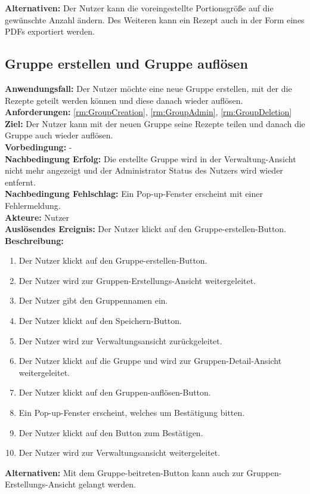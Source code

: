 \documentclass[parskip=full]{scrartcl}
\begin{document}
\textbf{Alternativen:} Der Nutzer kann die voreingestellte Portionsgröße auf die gewünschte Anzahl ändern. Des Weiteren kann ein Rezept auch in der Form eines PDFs exportiert werden.
\newpage

\subsection{Gruppe erstellen und Gruppe auflösen}
\textbf{Anwendungsfall:} Der Nutzer möchte eine neue Gruppe erstellen, mit der die Rezepte geteilt werden können und diese danach wieder auflösen.\\
\textbf{Anforderungen:} \ref{rm:GroupCreation}, \ref{rm:GroupAdmin}, \ref{rm:GroupDeletion} \\
\textbf{Ziel:} Der Nutzer kann mit der neuen Gruppe seine Rezepte teilen und danach die Gruppe auch wieder auflösen.\\
\textbf{Vorbedingung:} -\\
\textbf{Nachbedingung Erfolg:} Die erstellte Gruppe wird in der Verwaltung-Ansicht nicht mehr angezeigt und der Administrator Status des Nutzers wird wieder entfernt.\\
\textbf{Nachbedingung Fehlschlag:} Ein Pop-up-Fenster erscheint mit einer Fehlermeldung.\\
\textbf{Akteure:} Nutzer\\
\textbf{Auslösendes Ereignis:} Der Nutzer klickt auf den Gruppe-erstellen-Button.\\
\textbf{Beschreibung:}
\begin{enumerate}
    \item Der Nutzer klickt auf den Gruppe-erstellen-Button.
    \item Der Nutzer wird zur Gruppen-Erstellungs-Ansicht weitergeleitet.
    \item Der Nutzer gibt den Gruppennamen ein.
    \item Der Nutzer klickt auf den Speichern-Button.
    \item Der Nutzer wird zur Verwaltungsansicht zurückgeleitet.
    \item Der Nutzer klickt auf die Gruppe und wird zur Gruppen-Detail-Ansicht weitergeleitet.
    \item Der Nutzer klickt auf den Gruppen-auflösen-Button.
    \item Ein Pop-up-Fenster erscheint, welches um Bestätigung bitten.
    \item Der Nutzer klickt auf den Button zum Bestätigen.
    \item Der Nutzer wird zur Verwaltungsansicht weitergeleitet.
\end{enumerate}
\textbf{Alternativen:} Mit dem Gruppe-beitreten-Button kann auch zur Gruppen-Erstellungs-Ansicht gelangt werden.
\newpage
\end{document}
